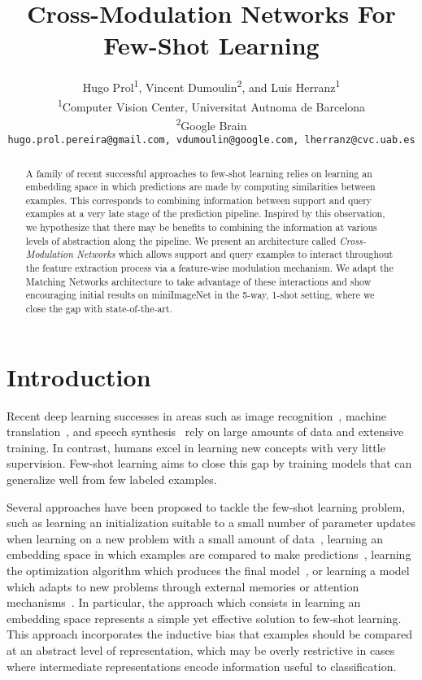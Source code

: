 \documentclass{article}
\title{Cross-Modulation Networks For Few-Shot Learning}
\author{
  Hugo Prol\textsuperscript{1}, Vincent Dumoulin\textsuperscript{2}, and
  Luis Herranz\textsuperscript{1} \\
  \textsuperscript{1}Computer Vision Center, Universitat Autnoma de Barcelona \\
  \textsuperscript{2}Google Brain \\
  \texttt{hugo.prol.pereira@gmail.com, vdumoulin@google.com, lherranz@cvc.uab.es}
}
\begin{document}

\maketitle

\begin{abstract}
  A family of recent successful approaches to few-shot learning relies
  on learning an embedding space in which predictions are made by
  computing similarities between examples. This corresponds to combining
  information between support and query examples at a very late
  stage of the prediction pipeline. Inspired by this observation, we
  hypothesize that there may be benefits to combining the information
  at various levels of abstraction along the pipeline. We present an
  architecture called \emph{Cross-Modulation Networks} which allows
  support and query examples to interact throughout the feature
  extraction process via a feature-wise modulation mechanism. We adapt the
  Matching Networks architecture to take advantage of these interactions
  and show encouraging initial results on miniImageNet in
  the 5-way, 1-shot setting, where we close the gap with state-of-the-art.
\end{abstract}

\section{Introduction}

Recent deep learning successes in areas such as image
recognition~\cite{simonyan14vgg,he2016resnet,hu17squeeze}, machine
translation~\cite{wu16googlemt,lample18phrase}, and speech
synthesis~\cite{oord2016wavenet} rely on large amounts of data and
extensive training. In contrast, humans excel in learning new concepts
with very little supervision. Few-shot learning aims to close this gap
by training models that can generalize well from few labeled examples.

Several approaches have been proposed to tackle the few-shot learning
problem, such as learning an initialization suitable to a small number
of parameter updates when learning on a new problem with a small
amount of
data~\cite{finn2017maml,nichol18reptile,kim2018bayesian,finn18platipus,grant18llama,rusu18leo},
learning an embedding space in which examples are compared to make
predictions~\cite{vinyals2016matching,snell2017proto,sung17relnet2,oreshkin18tadam},
learning the optimization algorithm which produces the final
model~\cite{ravi2017optim}, or learning a model which adapts to new
problems through external memories or attention
mechanisms~\cite{santoro2016meta,munkhdalai17condshift,shyam2017attentive,mishra2018simple}.
In particular, the approach which consists in learning an embedding
space represents a simple yet effective solution to few-shot learning.
This approach incorporates the inductive bias that examples should be
compared at an abstract level of representation, which may be overly
restrictive in cases where intermediate representations encode
information useful to classification.
\end{document}
